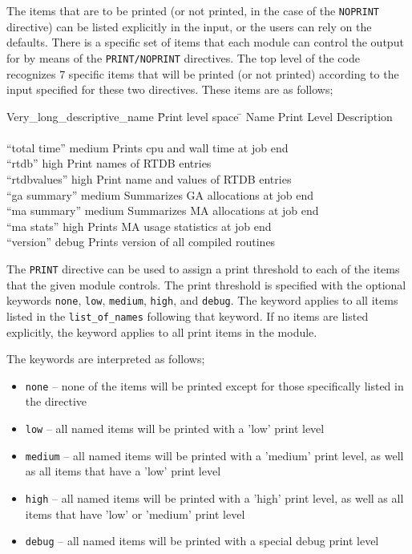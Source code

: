 The items that are to be printed (or not printed, in the case of the
\verb+NOPRINT+ directive) can be listed explicitly in the input, or the
users can rely on the defaults.  There
is a specific set of items that each module can control the output for
by means of the \verb+PRINT/NOPRINT+ directives.
The top level of the code recognizes 7 specific items that will be printed
(or not printed) according to the input specified for these two directives.
These items are as follows;
\begin{tabbing}
  Very\_long\_descriptive\_name \= Print level space \= \kill
  Name                   \> Print Level \> Description \\
                         \>        \> \\
 ``total time''        \> medium \> Prints cpu and wall time at job end\\
 ``rtdb''              \> high    \> Print names of RTDB entries\\
 ``rtdbvalues''        \> high    \> Print name and values of RTDB entries\\
 ``ga summary''        \> medium \> Summarizes GA allocations at job end \\
 ``ma summary''        \> medium \> Summarizes MA allocations at job end \\
 ``ma stats''          \> high   \> Prints MA usage statistics at job end \\
 ``version''           \> debug  \> Prints version of all compiled routines \\
\end{tabbing}

The \verb+PRINT+ directive can be used to assign a print threshold to
each of the items that the given module controls.  The print threshold is
specified with the optional keywords \verb+none+, \verb+low+, \verb+medium+,
\verb+high+, and \verb+debug+.  The keyword applies to all items listed
in the \verb+list_of_names+ following that keyword.  If no items are listed
explicitly, the keyword applies to all print items in the module.

The keywords are interpreted as follows;

\begin{itemize}
\item \verb+none+ -- none of the items will be printed except for those
specifically listed in the directive
\item \verb+low+ -- all named items will be printed with a 'low' print level
\item \verb+medium+ -- all named items will be printed with a 'medium' print
level, as well as all items that have a 'low' print level
\item \verb+high+ -- all named items will be printed with a 'high' print
level, as well as all items that have 'low' or 'medium' print level
\item \verb+debug+ -- all named items will be printed with a special debug print level
\end{itemize}

